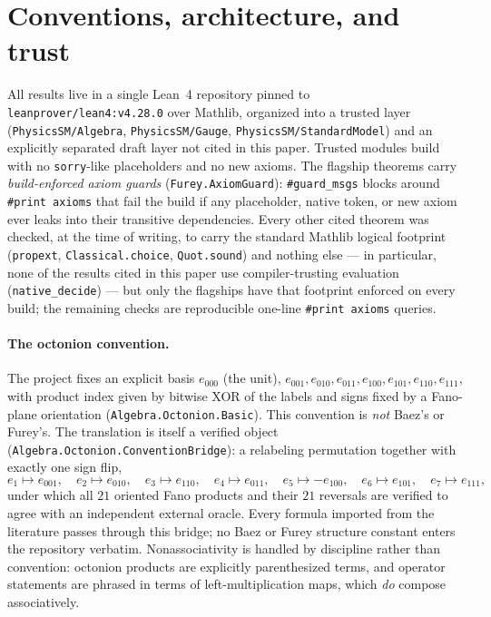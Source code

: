 \documentclass[11pt]{article}
\newcommand{\leanname}[1]{\texttt{#1}}
\begin{document}
\section{Conventions, architecture, and trust}
\label{sec:conventions}

All results live in a single Lean~4 repository pinned to
\leanname{leanprover/lean4:v4.28.0} over Mathlib, organized into a trusted
layer (\leanname{PhysicsSM/Algebra}, \leanname{PhysicsSM/Gauge},
\leanname{PhysicsSM/StandardModel}) and an explicitly separated draft
layer not cited in this paper.  Trusted modules build with no
\leanname{sorry}-like placeholders and no new axioms.  The flagship
theorems carry \emph{build-enforced axiom guards}
(\leanname{Furey.AxiomGuard}): \leanname{\#guard\_msgs} blocks around
\leanname{\#print axioms} that fail the build if any placeholder, native
token, or new axiom ever leaks into their transitive dependencies.
Every other cited theorem was checked, at the time of writing, to carry
the standard Mathlib logical footprint
(\leanname{propext}, \leanname{Classical.choice}, \leanname{Quot.sound})
and nothing else --- in particular, none of the results cited in this
paper use compiler-trusting evaluation (\leanname{native\_decide}) ---
but only the flagships have that footprint enforced on every build; the
remaining checks are reproducible one-line \leanname{\#print axioms}
queries.

\paragraph{The octonion convention.}  The project fixes an explicit basis
$e_{000}$ (the unit), $e_{001}, e_{010}, e_{011}, e_{100}, e_{101},
e_{110}, e_{111}$, with product index given by bitwise XOR of the labels
and signs fixed by a Fano-plane orientation
(\leanname{Algebra.Octonion.Basic}).  This convention is \emph{not}
Baez's or Furey's.  The translation is itself a verified object
(\leanname{Algebra.Octonion.ConventionBridge}): a relabeling permutation
together with exactly one sign flip,
\[
e_1 \mapsto e_{001},\quad e_2 \mapsto e_{010},\quad e_3 \mapsto e_{110},
\quad e_4 \mapsto e_{011},\quad
\boxed{e_5 \mapsto -e_{100}},\quad e_6 \mapsto e_{101},\quad
e_7 \mapsto e_{111},
\]
under which all $21$ oriented Fano products and their $21$ reversals are
verified to agree with an independent external oracle.  Every formula
imported from the literature passes through this bridge; no Baez or Furey
structure constant enters the repository verbatim.  Nonassociativity is
handled by discipline rather than convention: octonion products are
explicitly parenthesized terms, and operator statements are phrased in
terms of left-multiplication maps, which \emph{do} compose associatively.
\end{document}
